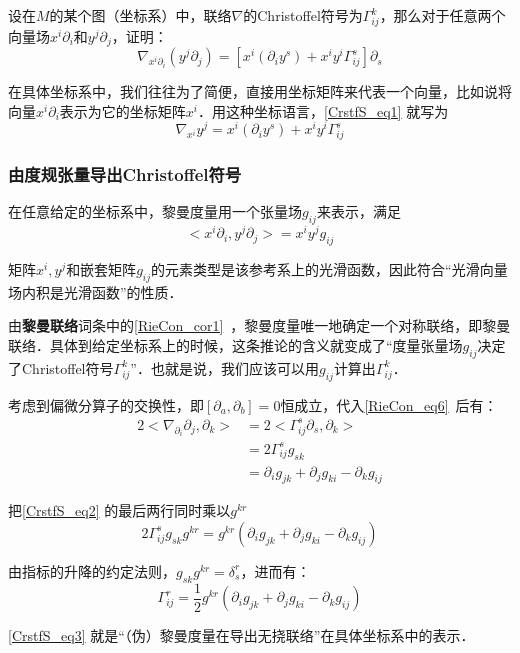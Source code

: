 \begin{exercise}{}
设在$M$的某个图（坐标系）中，联络$\nabla$的Christoffel符号为$\Gamma^k_{ij}$，那么对于任意两个向量场$x^i\partial_i$和$y^j\partial_j$，证明：
\begin{equation}\label{CrstfS_eq1}
\nabla_{x^i\partial_i}(y^j\partial_j)=[x^i(\partial_iy^s)+x^iy^i\Gamma^s_{ij}]\partial_s
\end{equation}
\end{exercise}

在具体坐标系中，我们往往为了简便，直接用坐标矩阵来代表一个向量，比如说将向量$x^i\partial_i$表示为它的坐标矩阵$x^i$．用这种坐标语言，\autoref{CrstfS_eq1} 就写为
\begin{equation}
\nabla_{x^i}y^j=x^i(\partial_iy^s)+x^iy^i\Gamma^s_{ij}
\end{equation}

\subsubsection{由度规张量导出Christoffel符号}

在任意给定的坐标系中，黎曼度量用一个张量场$g_{ij}$来表示，满足
\begin{equation}
<x^i\partial_i, y^j\partial_j>=x^iy^jg_{ij}
\end{equation}

矩阵$x^i, y^j$和嵌套矩阵$g_{ij}$的元素类型是该参考系上的光滑函数，因此符合“光滑向量场内积是光滑函数”的性质．

由\textbf{黎曼联络}词条中的\autoref{RieCon_cor1}~，黎曼度量唯一地确定一个对称联络，即黎曼联络．具体到给定坐标系上的时候，这条推论的含义就变成了“度量张量场$g_{ij}$决定了Christoffel符号$\Gamma^k_{ij}$”．也就是说，我们应该可以用$g_{ij}$计算出$\Gamma^k_{ij}$．

考虑到偏微分算子的交换性，即$[\partial_a, \partial_b]=0$恒成立，代入\autoref{RieCon_eq6}~后有：
\begin{equation}\label{CrstfS_eq2}
\begin{aligned}
2<\nabla_{\partial_i}\partial_j, \partial_k>&=2<\Gamma^s_{ij}\partial_s, \partial_k>\\
&=2\Gamma^s_{ij}g_{sk}\\
&=\partial_ig_{jk}+\partial_jg_{ki}-\partial_kg_{ij}
\end{aligned}
\end{equation}

把\autoref{CrstfS_eq2} 的最后两行同时乘以$g^{kr}$
\begin{equation}
2\Gamma^{s}_{ij}g_{sk}g^{kr}=g^{kr}(\partial_ig_{jk}+\partial_jg_{ki}-\partial_kg_{ij})
\end{equation}

由指标的升降的约定法则，$g_{sk}g^{kr}=\delta_s^r$，进而有：
\begin{equation}\label{CrstfS_eq3}
\Gamma^{r}_{ij}=\frac{1}{2}g^{kr}(\partial_ig_{jk}+\partial_jg_{ki}-\partial_kg_{ij})
\end{equation}

\autoref{CrstfS_eq3} 就是“（伪）黎曼度量在导出无挠联络”在具体坐标系中的表示．






